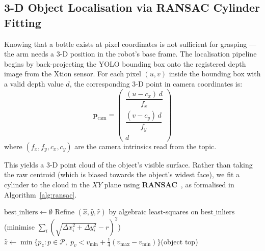 \subsection{3-D Object Localisation via RANSAC Cylinder Fitting}

Knowing that a bottle exists at pixel coordinates is not sufficient for
grasping --- the arm needs a 3-D position in the robot's base frame.
The localisation pipeline begins by back-projecting the YOLO bounding box onto
the registered depth image from the Xtion sensor.
For each pixel $(u, v)$ inside the bounding box with a valid depth value $d$,
the corresponding 3-D point in camera coordinates is:
\begin{equation}
  \mathbf{p}_{\text{cam}} =
  \begin{pmatrix}
    \dfrac{(u - c_x)\,d}{f_x} \\[6pt]
    \dfrac{(v - c_y)\,d}{f_y} \\[6pt]
    d
  \end{pmatrix}
\end{equation}
where $(f_x, f_y, c_x, c_y)$ are the camera intrinsics read from the
 topic.

This yields a 3-D point cloud of the object's visible surface.
Rather than taking the raw centroid (which is biased towards the object's
widest face), we fit a cylinder to the cloud in the $XY$ plane using
\textbf{RANSAC}~\cite{schnabel2007ransac}, as formalised in
Algorithm~\ref{alg:ransac}.

\begin{algorithm}[H]
\caption{RANSAC cylinder fitting for 3-D object localisation}
\label{alg:ransac}
\DontPrintSemicolon
{}
$\text{best\_inliers} \gets \emptyset$\;
Refine $(\hat{x}, \hat{y}, \hat{r})$ by algebraic least-squares on
$\text{best\_inliers}$ (minimise $\sum_i (\sqrt{\Delta x_i^2+\Delta y_i^2} - r)^2$)\;
$\hat{z} \gets \min\{p_z : p \in \mathcal{P},\; p_v < v_{\min} + \tfrac{1}{4}(v_{\max}-v_{\min})\}$\quad (object top)\;
\end{algorithm}

